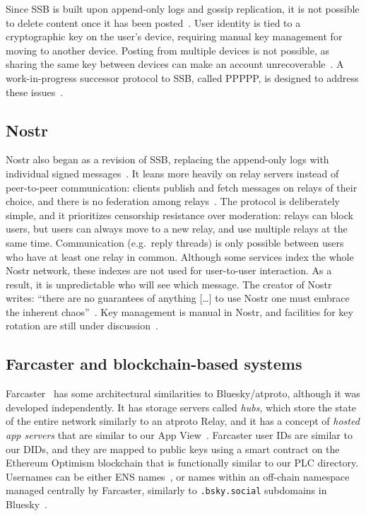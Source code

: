\documentclass[sigconf,nonacm]{acmart}
\begin{document}
Since SSB is built upon append-only logs and gossip replication, it is not possible to delete content once it has been posted~\cite{SSBDeletion}.
User identity is tied to a cryptographic key on the user's device, requiring manual key management for moving to another device.
Posting from multiple devices is not possible, as sharing the same key between devices can make an account unrecoverable~\cite{SSBMultiDevice}.
A work-in-progress successor protocol to SSB, called PPPPP, is designed to address these issues~\cite{PPPPP}.

\subsection{Nostr}

Nostr also began as a revision of SSB, replacing the append-only logs with individual signed messages~\cite{SSBNostr}.
It leans more heavily on relay servers instead of peer-to-peer communication: clients publish and fetch messages on relays of their choice, and there is no federation among relays~\cite{Nostr}.
The protocol is deliberately simple, and it prioritizes censorship resistance over moderation: relays can block users, but users can always move to a new relay, and use multiple relays at the same time.
Communication (e.g.\ reply threads) is only possible between users who have at least one relay in common.
Although some services index the whole Nostr network, these indexes are not used for user-to-user interaction.
As a result, it is unpredictable who will see which message.
The creator of Nostr writes: ``there are no guarantees of anything [\dots] to use Nostr one must embrace the inherent chaos''~\cite{NostrVision}. 
Key management is manual in Nostr, and facilities for key rotation are still under discussion~\cite{NostrKeyRotation}.


\subsection{Farcaster and blockchain-based systems}

Farcaster~\cite{Farcaster} has some architectural similarities to Bluesky/atproto, although it was developed independently.
It has storage servers called \emph{hubs}, which store the state of the entire network similarly to an atproto Relay, and it has a concept of \emph{hosted app servers} that are similar to our App View~\cite{FarcasterOverview}.
Farcaster user IDs are similar to our DIDs, and they are mapped to public keys using a smart contract on the Ethereum Optimism blockchain that is functionally similar to our PLC directory.
Usernames can be either ENS names~\cite{ENS}, or names within an off-chain namespace managed centrally by Farcaster, similarly to \texttt{.bsky.social} subdomains in Bluesky~\cite{FarcasterArchitecture}.
\end{document}
